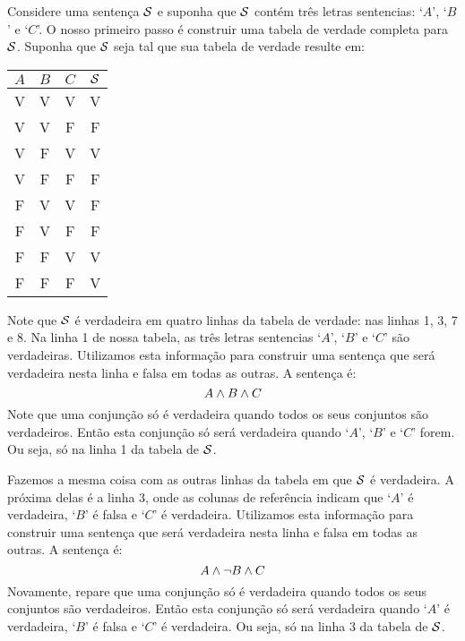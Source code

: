 Considere uma sentença $\mathcal{S}$ e suponha que $\mathcal{S}$ contém três letras sentencias:  `$A$', `$B$' e `$C$'.
O nosso primeiro passo é construir uma tabela de verdade completa para $\mathcal{S}$.
Suponha que $\mathcal{S}$ seja tal que sua tabela de verdade resulte em:
\begin{center}
\begin{tabular}{c c c | c}
$A$ & $B$ & $C$ & $\mathcal{S}$\\
\hline
 V & V & V & V \\
 V & V & F & F \\
 V & F & V & V \\
 V & F & F & F \\
 F & V & V & F \\
 F & V & F & F \\
 F & F & V & V \\
 F & F & F & V
\end{tabular}
\end{center}
%
%

\noindent Note que $\mathcal{S}$ é verdadeira em quatro linhas da tabela de verdade: nas linhas 1, 3, 7 e 8.
Na linha 1 de nossa tabela, as três letras sentencias `$A$', `$B$' e `$C$' são verdadeiras.
Utilizamos esta informação para construir uma sentença que será verdadeira nesta linha e falsa em todas as outras.
A sentença é: 
		$$A \wedge B \wedge C$$
Note que uma conjunção só é verdadeira quando todos os seus conjuntos são verdadeiros.
Então esta conjunção só será verdadeira quando `$A$', `$B$' e `$C$' forem.
Ou seja, só na linha 1 da tabela de $\mathcal{S}$.

Fazemos a mesma coisa com as outras linhas da tabela em que $\mathcal{S}$ é verdadeira.
A próxima delas  é a linha 3, onde as colunas de referência indicam que `$A$' é verdadeira, `$B$' é falsa e `$C$' é verdadeira.
Utilizamos esta informação para construir uma sentença que será verdadeira nesta linha e falsa em todas as outras.
A sentença é: 
		$$A \wedge \neg B \wedge C$$
Novamente, repare que uma conjunção só é verdadeira quando todos os seus conjuntos são verdadeiros. Então esta conjunção só será verdadeira quando `$A$' é verdadeira, `$B$' é falsa e `$C$' é verdadeira.
Ou seja, só na linha 3 da tabela de $\mathcal{S}$.

